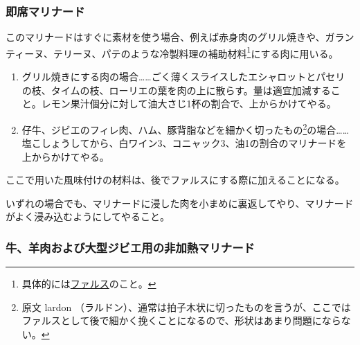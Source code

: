 \begin{recette}
\hypertarget{marinade-instantanee}{%
\subsubsection{即席マリナード}\label{marinade-instantanee}}



このマリナードはすぐに素材を使う場合、例えば赤身肉のグリル焼きや、ガランティーヌ、テリーヌ、パテのような冷製料理の補助材料\footnote{具体的には\protect\hyperlink{farces}{ファルス}のこと。}にする肉に用いる。

\begin{enumerate}
\def\labelenumi{\arabic{enumi}.}
\item
  グリル焼きにする肉の場合\ldots{}\ldots{}ごく薄くスライスしたエシャロットとパセリの枝、タイムの枝、ローリエの葉を肉の上に散らす。量は適宜加減すること。レモン果汁\undemi{}個分に対して油大さじ1杯の割合で、上からかけてやる。
\item
  仔牛、ジビエのフィレ肉、ハム、豚背脂などを細かく切ったもの\footnote{原文
    lardon
    （ラルドン）、通常は拍子木状に切ったものを言うが、ここではファルスとして後で細かく挽くことになるので、形状はあまり問題にならない。}の場合\ldots{}\ldots{}塩こしょうしてから、白ワイン3、コニャック3、油1の割合のマリナードを上からかけてやる。
\end{enumerate}

ここで用いた風味付けの材料は、後でファルスにする際に加えることになる。

いずれの場合でも、マリナードに浸した肉を小まめに裏返してやり、マリナードがよく浸み込むようにしてやること。

\hypertarget{marinade-crue-pour-viandes-de-boucherie-ou-venaison}{%
\subsubsection{牛、羊肉および大型ジビエ用の非加熱マリナード}\label{marinade-crue-pour-viandes-de-boucherie-ou-venaison}}




\end{recette}
